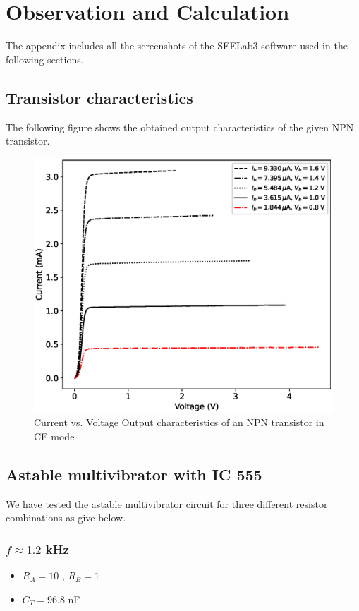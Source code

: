 \section{Observation and Calculation}
The appendix includes all the screenshots of the SEELab3 software used in the following sections.

\subsection{Transistor characteristics}
The following figure shows the obtained output characteristics of the given NPN transistor.
    \begin{figure}[h]
        \centering
        \includegraphics[width=1\columnwidth]{images/npn.eps}
        \caption{Current vs. Voltage Output characteristics of an NPN transistor in CE mode}
    \end{figure}

\subsection{Astable multivibrator with IC 555}

We have tested the astable multivibrator circuit for three different resistor combinations as give below.
\subsubsection{$f \approx 1.2$ kHz}
\begin{itemize}
    \item $R_A=10$ \kohm, $R_B=1$ \kohm
    \item $C_T=96.8$ nF
\end{itemize}

